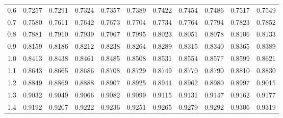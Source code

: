 \begin{table}[p]
\begin{center}
{\begin{tabular}{c | rrrrr | rrrrr |}
  0.6 & \footnotesize{0.7257} & \footnotesize{0.7291} & \footnotesize{0.7324} & \footnotesize{0.7357} & \footnotesize{0.7389} & \footnotesize{0.7422} & \footnotesize{0.7454} & \footnotesize{0.7486} & \footnotesize{0.7517} & \footnotesize{0.7549} \\
  0.7 & \footnotesize{0.7580} & \footnotesize{0.7611} & \footnotesize{0.7642} & \footnotesize{0.7673} & \footnotesize{0.7704} & \footnotesize{0.7734} & \footnotesize{0.7764} & \footnotesize{0.7794} & \footnotesize{0.7823} & \footnotesize{0.7852} \\
  0.8 & \footnotesize{0.7881} & \footnotesize{0.7910} & \footnotesize{0.7939} & \footnotesize{0.7967} & \footnotesize{0.7995} & \footnotesize{0.8023} & \footnotesize{0.8051} & \footnotesize{0.8078} & \footnotesize{0.8106} & \footnotesize{0.8133} \\
  0.9 & \footnotesize{0.8159} & \footnotesize{0.8186} & \footnotesize{0.8212} & \footnotesize{0.8238} & \footnotesize{0.8264} & \footnotesize{0.8289} & \footnotesize{0.8315} & \footnotesize{0.8340} & \footnotesize{0.8365} & \footnotesize{0.8389} \\
  \hline
  \hline
  1.0 & \footnotesize{0.8413} & \footnotesize{0.8438} & \footnotesize{0.8461} & \footnotesize{0.8485} & \footnotesize{0.8508} & \footnotesize{0.8531} & \footnotesize{0.8554} & \footnotesize{0.8577} & \footnotesize{0.8599} & \footnotesize{0.8621} \\
  1.1 & \footnotesize{0.8643} & \footnotesize{0.8665} & \footnotesize{0.8686} & \footnotesize{0.8708} & \footnotesize{0.8729} & \footnotesize{0.8749} & \footnotesize{0.8770} & \footnotesize{0.8790} & \footnotesize{0.8810} & \footnotesize{0.8830} \\
  1.2 & \footnotesize{0.8849} & \footnotesize{0.8869} & \footnotesize{0.8888} & \footnotesize{0.8907} & \footnotesize{0.8925} & \footnotesize{0.8944} & \footnotesize{0.8962} & \footnotesize{0.8980} & \footnotesize{0.8997} & \footnotesize{0.9015} \\
  1.3 & \footnotesize{0.9032} & \footnotesize{0.9049} & \footnotesize{0.9066} & \footnotesize{0.9082} & \footnotesize{0.9099} & \footnotesize{0.9115} & \footnotesize{0.9131} & \footnotesize{0.9147} & \footnotesize{0.9162} & \footnotesize{0.9177} \\
  1.4 & \footnotesize{0.9192} & \footnotesize{0.9207} & \footnotesize{0.9222} & \footnotesize{0.9236} & \footnotesize{0.9251} & \footnotesize{0.9265} & \footnotesize{0.9279} & \footnotesize{0.9292} & \footnotesize{0.9306} & \footnotesize{0.9319} \\

\end{tabular}}
\end{center}
\end{table}
